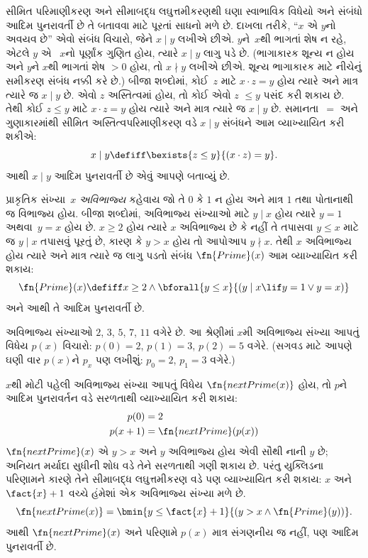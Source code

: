 \documentclass[../../../include/open-logic-section]{subfiles}
\begin{document}

સીમિત પરિમાણીકરણ અને સીમાબદ્ધ લઘુત્તમીકરણથી ઘણા સ્વાભાવિક વિધેયો
અને સંબંધો આદિમ પુનરાવર્તી છે તે બતાવવા માટે પૂરતાં સાધનો મળે છે.
દાખલા તરીકે, ``$x$ એ $y$નો અવયવ છે'' એવો સંબંધ વિચારો, જેને
$x \mid y$ લખીએ છીએ. $y$ને~$x$થી ભાગતાં શેષ ન રહે, એટલે $y$ એ
~$x$નો પૂર્ણાંક ગુણિત હોય, ત્યારે $x \mid y$ લાગુ પડે છે. (ભાગાકારક
શૂન્ય ન હોય અને $y$ને $x$થી ભાગતાં શેષ $> 0$ હોય, તો $x \nmid y$
લખીએ છીએ. શૂન્ય ભાગાકારક માટે નીચેનું સમીકરણ સંબંધ નક્કી કરે છે.)
બીજા શબ્દોમાં, કોઈ~$z$ માટે $x \cdot z = y$ હોય
ત્યારે અને માત્ર ત્યારે જ $x \mid y$ છે. એવો $z$ અસ્તિત્વમાં
હોય, તો કોઈ એવો $z$ $\leq y$ પસંદ કરી શકાય છે. તેથી કોઈ
$z \le y$ માટે $x \cdot z = y$ હોય ત્યારે અને માત્ર ત્યારે જ
$x \mid y$ છે. સમાનતા~$=$ અને ગુણાકારમાંથી સીમિત
અસ્તિત્વપરિમાણીકરણ વડે $x \mid y$ સંબંધને આમ વ્યાખ્યાયિત કરી
શકીએ:
\[
x \mid y \defiff \bexists{z \leq y}{(x \cdot z) = y}.
\]
આથી $x \mid y$ આદિમ પુનરાવર્તી છે એવું આપણે બતાવ્યું છે.


પ્રાકૃતિક સંખ્યા~$x$ \emph{અવિભાજ્ય} કહેવાય જો તે $0$ કે $1$
ન હોય અને માત્ર $1$ તથા પોતાનાથી જ વિભાજ્ય હોય. બીજા શબ્દોમાં,
અવિભાજ્ય સંખ્યાઓ માટે $y \mid x$ હોય ત્યારે $y = 1$ અથવા~$y=x$
હોય છે. $x\geq 2$ હોય ત્યારે $x$ અવિભાજ્ય છે કે નહીં તે તપાસવા $y \le x$ માટે જ
$y \mid x$ તપાસવું પૂરતું છે, કારણ કે $y > x$ હોય તો આપોઆપ
$y \nmid x$. તેથી $x$ અવિભાજ્ય હોય ત્યારે અને માત્ર ત્યારે જ
લાગુ પડતો સંબંધ $\fn{Prime}(x)$ આમ વ્યાખ્યાયિત કરી શકાય:
\[
\fn{Prime}(x) \defiff x \geq 2 \land \bforall{y \leq x}{(y \mid x \lif y
  = 1 \lor y = x)}
\]
અને આથી તે આદિમ પુનરાવર્તી છે.

અવિભાજ્ય સંખ્યાઓ $2$, $3$, $5$, $7$, $11$ વગેરે છે. આ શ્રેણીમાં
$x$મી અવિભાજ્ય સંખ્યા આપતું વિધેય $p(x)$ વિચારો: $p(0) =
2$, $p(1) = 3$, $p(2) = 5$ વગેરે. (સગવડ માટે આપણે ઘણી વાર
$p(x)$ને $p_x$ પણ લખીશું: $p_0=2$, $p_1=3$ વગેરે.)

$x$થી મોટી પહેલી અવિભાજ્ય સંખ્યા આપતું વિધેય
$\fn{nextPrime(x)}$ હોય, તો $p$ને આદિમ પુનરાવર્તન વડે સરળતાથી
વ્યાખ્યાયિત કરી શકાય:
\begin{align*}
  p(0) & = 2\\
  p(x+1) & = \fn{nextPrime}(p(x))
\end{align*}
$\fn{nextPrime}(x)$ એ $y > x$ અને $y$ અવિભાજ્ય હોય એવી સૌથી
નાની $y$ છે; અનિયત મર્યાદા સુધીની શોધ વડે તેને સરળતાથી ગણી
શકાય છે. પરંતુ યુક્લિડના પરિણામને કારણે તેને સીમાબદ્ધ
લઘુત્તમીકરણ વડે પણ વ્યાખ્યાયિત કરી શકાય: $x$ અને $\fact{x}+1$
વચ્ચે હંમેશાં એક અવિભાજ્ય સંખ્યા મળે છે.
\[
  \fn{nextPrime(x)} =
  \bmin{y \leq \fact{x}+1}{(y > x \land \fn{Prime}(y))}.
\]
આથી $\fn{nextPrime}(x)$ અને પરિણામે $p(x)$ માત્ર સંગણનીય જ નહીં,
પણ આદિમ પુનરાવર્તી છે.
\end{document}
